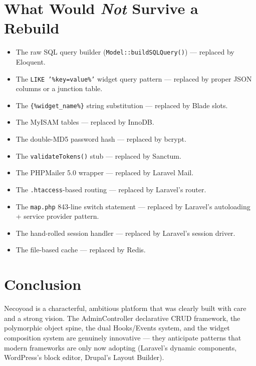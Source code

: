 \documentclass[11pt,a4paper]{article}
\begin{document}
\section{What Would \emph{Not} Survive a Rebuild}\label{sec:discard}

\begin{itemize}[leftmargin=1.6em,itemsep=2pt]
  \item The raw SQL query builder (\texttt{Model::buildSQLQuery()}) ---
        replaced by Eloquent.
  \item The \texttt{LIKE '\%key=value\%'} widget query pattern ---
        replaced by proper JSON columns or a junction table.
  \item The \texttt{\{\%widget\_name\%\}} string substitution ---
        replaced by Blade slots.
  \item The MyISAM tables --- replaced by InnoDB.
  \item The double-MD5 password hash --- replaced by bcrypt.
  \item The \texttt{validateTokens()} stub --- replaced by Sanctum.
  \item The PHPMailer 5.0 wrapper --- replaced by Laravel Mail.
  \item The \texttt{.htaccess}-based routing --- replaced by Laravel's
        router.
  \item The \texttt{map.php} 843-line switch statement --- replaced by
        Laravel's autoloading + service provider pattern.
  \item The hand-rolled session handler --- replaced by Laravel's
        session driver.
  \item The file-based cache --- replaced by Redis.
\end{itemize}

\section{Conclusion}\label{sec:conclusion}

Necoyoad is a characterful, ambitious platform that was clearly built
with care and a strong vision. The AdminController declarative CRUD
framework, the polymorphic object spine, the dual Hooks/Events system,
and the widget composition system are genuinely innovative --- they
anticipate patterns that modern frameworks are only now adopting
(Laravel's dynamic components, WordPress's block editor, Drupal's
Layout Builder).
\end{document}
